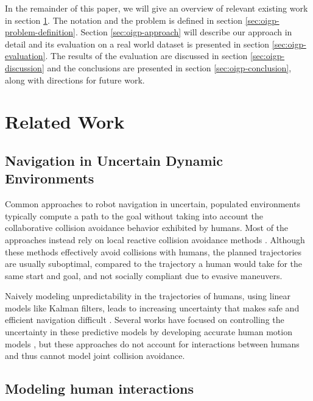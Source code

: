 In the remainder of this paper, we will give an overview of relevant
existing work in section \ref{sec:oigp-related-work}. The notation and the
problem is defined in section \ref{sec:oigp-problem-definition}. Section
\ref{sec:oigp-approach} will describe our approach in detail and its
evaluation on a real world dataset is presented in section
\ref{sec:oigp-evaluation}. The results of the evaluation are discussed in
section \ref{sec:oigp-discussion} and the conclusions are presented in
section \ref{sec:oigp-conclusion}, along with directions for future work.

\section{Related Work}
\label{sec:oigp-related-work}

\subsection{Navigation in Uncertain Dynamic Environments}
\label{sec:oigp-navig-dynam-envir}
Common approaches to robot navigation in uncertain, populated environments typically compute a path to the goal without taking into account the collaborative collision avoidance behavior exhibited by humans. Most of the approaches instead rely on local reactive collision avoidance methods \cite{philippsen2003smooth, thrun99}. Although these methods effectively avoid collisions with humans, the planned trajectories are usually suboptimal, compared to the trajectory a human would take for the same start and goal, and not socially compliant due to evasive maneuvers.

Naively modeling unpredictability in the trajectories of humans, using linear models like Kalman filters, leads to increasing uncertainty that makes safe and efficient navigation difficult \cite{trautman10}. Several works have focused on controlling the uncertainty in these predictive models by developing accurate human motion models \cite{thompson09, bennewitz05}, but these approaches do not account for interactions between humans and thus cannot model joint collision avoidance. 

\subsection{Modeling human interactions}
\label{sec:oigp-inter-betw-humans}

